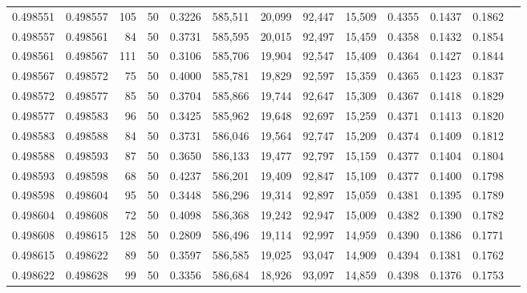 \begin{tabular}{rrrrrrrrrrrrr}
0.498551 & 0.498557 &   105 &  50 &                                     0.3226 & 585,511 &  20,099 &  92,447 &  15,509 & 0.4355 & 0.1437 & 0.1862 \\
0.498557 & 0.498561 &    84 &  50 &                                     0.3731 & 585,595 &  20,015 &  92,497 &  15,459 & 0.4358 & 0.1432 & 0.1854 \\
0.498561 & 0.498567 &   111 &  50 &                                     0.3106 & 585,706 &  19,904 &  92,547 &  15,409 & 0.4364 & 0.1427 & 0.1844 \\
0.498567 & 0.498572 &    75 &  50 &                                     0.4000 & 585,781 &  19,829 &  92,597 &  15,359 & 0.4365 & 0.1423 & 0.1837 \\
0.498572 & 0.498577 &    85 &  50 &                                     0.3704 & 585,866 &  19,744 &  92,647 &  15,309 & 0.4367 & 0.1418 & 0.1829 \\
0.498577 & 0.498583 &    96 &  50 &                                     0.3425 & 585,962 &  19,648 &  92,697 &  15,259 & 0.4371 & 0.1413 & 0.1820 \\
0.498583 & 0.498588 &    84 &  50 &                                     0.3731 & 586,046 &  19,564 &  92,747 &  15,209 & 0.4374 & 0.1409 & 0.1812 \\
0.498588 & 0.498593 &    87 &  50 &                                     0.3650 & 586,133 &  19,477 &  92,797 &  15,159 & 0.4377 & 0.1404 & 0.1804 \\
0.498593 & 0.498598 &    68 &  50 &                                     0.4237 & 586,201 &  19,409 &  92,847 &  15,109 & 0.4377 & 0.1400 & 0.1798 \\
0.498598 & 0.498604 &    95 &  50 &                                     0.3448 & 586,296 &  19,314 &  92,897 &  15,059 & 0.4381 & 0.1395 & 0.1789 \\
0.498604 & 0.498608 &    72 &  50 &                                     0.4098 & 586,368 &  19,242 &  92,947 &  15,009 & 0.4382 & 0.1390 & 0.1782 \\
0.498608 & 0.498615 &   128 &  50 &                                     0.2809 & 586,496 &  19,114 &  92,997 &  14,959 & 0.4390 & 0.1386 & 0.1771 \\
0.498615 & 0.498622 &    89 &  50 &                                     0.3597 & 586,585 &  19,025 &  93,047 &  14,909 & 0.4394 & 0.1381 & 0.1762 \\
0.498622 & 0.498628 &    99 &  50 &                                     0.3356 & 586,684 &  18,926 &  93,097 &  14,859 & 0.4398 & 0.1376 & 0.1753 \\

\end{tabular}
